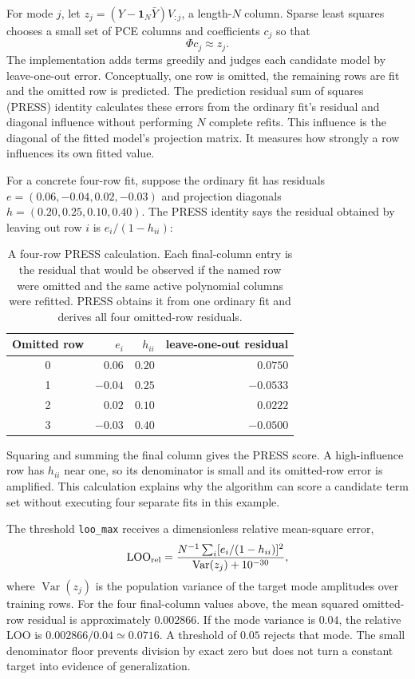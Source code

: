 \documentclass[10pt,aps,prd,twocolumn,nofootinbib]{revtex4-2}
\newcommand{\code}[1]{\texttt{#1}}
\begin{document}
For mode \(j\), let
$z_j=(Y-\mathbf 1_N\bar Y)V_{:j}$, a length-$N$ column.  Sparse least squares
chooses a small set of PCE columns and coefficients \(c_j\) so that
\begin{equation*}
 \Phi c_j\approx z_j.
\end{equation*}
The implementation adds terms greedily and judges each candidate model by
leave-one-out error.  Conceptually, one row is omitted, the remaining rows are
fit and the omitted row is predicted.  The prediction residual sum of
squares (PRESS) identity calculates these errors from the ordinary fit's
residual and diagonal influence without performing \(N\) complete refits.  This
influence is the diagonal of the fitted model's projection matrix.  It measures how strongly
a row influences its own fitted value.

For a concrete four-row fit, suppose the ordinary fit has residuals
$e=(0.06,-0.04,0.02,-0.03)$ and projection diagonals
$h=(0.20,0.25,0.10,0.40)$.  The PRESS identity says the residual obtained by
leaving out row $i$ is $e_i/(1-h_{ii})$:
\begin{table}[t]
\centering
\begin{tabular}{c@{\qquad}r@{\qquad}r@{\qquad}r}
\toprule
Omitted row & $e_i$ & $h_{ii}$ & leave-one-out residual \\
\midrule
0 & $0.06$ & $0.20$ & $0.0750$ \\
1 & $-0.04$ & $0.25$ & $-0.0533$ \\
2 & $0.02$ & $0.10$ & $0.0222$ \\
3 & $-0.03$ & $0.40$ & $-0.0500$ \\
\bottomrule
\end{tabular}
\caption{A four-row PRESS calculation.  Each final-column entry is the
residual that would be observed if the named row were omitted and the same
active polynomial columns were refitted.  PRESS obtains it from one ordinary
fit and derives all four omitted-row residuals.}
\label{tab:press-example}
\end{table}
Squaring and summing the final column gives the PRESS score.  A high-influence
row has $h_{ii}$ near one, so its denominator is small and its omitted-row
error is amplified.  This calculation explains why the algorithm can score a
candidate term set without executing four separate fits in this example.

The threshold \code{loo\_max} receives a dimensionless relative mean-square
error,
\begin{equation*}
 \operatorname{LOO}_{\rm rel}
 =\frac{N^{-1}\sum_i[e_i/(1-h_{ii})]^2}
        {\operatorname{Var}(z_j)+10^{-30}},
\end{equation*}
where $\operatorname{Var}(z_j)$ is the population variance of the target mode
amplitudes over training rows.  For the four final-column values above, the
mean squared omitted-row residual is approximately $0.002866$.  If the mode
variance is $0.04$, the relative LOO is $0.002866/0.04\simeq0.0716$.  A
threshold of $0.05$ rejects that mode.  The small denominator floor prevents
division by exact zero but does not turn a constant target into evidence of
generalization.
\end{document}
